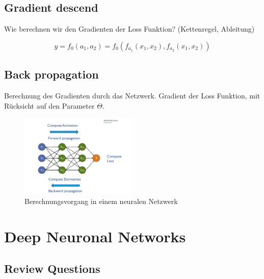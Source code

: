 \documentclass[a4paper]{article}
\begin{document}
		\subsection{Gradient descend}
		
		Wie berechnen wir den Gradienten der Loss Funktion? (Kettenregel, Ableitung)
		
		$$ y = f_{0} ( a_1, a_2 ) = f_0 ( f_{a_1} ( x_1, x_2 ), f_{a_2} ( x_1, x_2 ) ) $$
		
		\newpage
		
		\subsection{Back propagation}
		
		Berechnung des Gradienten durch das Netzwerk. Gradient der Loss Funktion, mit Rücksicht auf den Parameter $\Theta$.
		
		\begin{figure}[htb!]
			\centering
			\includegraphics[width=0.5\textwidth]{img/05_neuronal_networks/back_prop.png}
			\caption{Berechnungsvorgang in einem neuralen Netzwerk}
			\label{fig:05_neuronet_back_prop}
		\end{figure}
		
	
	\section{Deep Neuronal Networks}
	
		\subsection{Review Questions}
		
\end{document}
